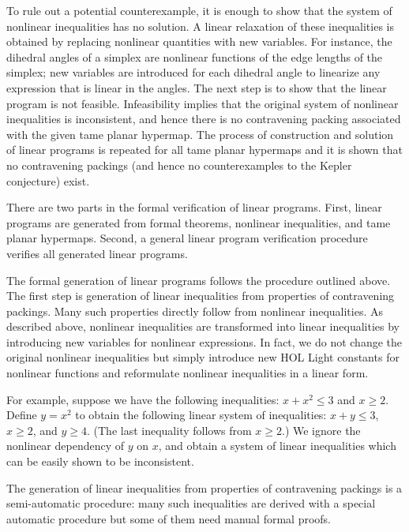 To rule out a potential counterexample, it is enough to show that the
system of nonlinear inequalities has no solution.  A linear relaxation
of these inequalities is obtained by replacing nonlinear quantities
with new variables. For instance, the dihedral angles of a simplex are
nonlinear functions of the edge lengths of the simplex; new variables
are introduced for each dihedral angle to linearize any expression that
is linear in the angles.  The next step is to show that
the linear program is not feasible. Infeasibility implies that the original
system of nonlinear inequalities is inconsistent, and hence there is
no contravening packing associated with the given tame planar
hypermap. The process of construction and solution of linear programs
is repeated for all tame planar hypermaps and it is shown that no
contravening packings (and hence no counterexamples to the Kepler
conjecture) exist.

There are two parts in the formal verification of linear
programs. First, linear programs are generated from formal theorems,
nonlinear inequalities, and tame planar hypermaps. Second, a general linear
program verification procedure verifies all generated linear programs.

The formal generation of linear programs follows the procedure
outlined above. The first step is generation of linear inequalities
from properties of contravening packings. Many such properties
directly follow from nonlinear inequalities. As described above,
nonlinear inequalities are transformed into linear inequalities by
introducing new variables for nonlinear expressions. In fact, we do
not change the original nonlinear inequalities but simply introduce
new HOL Light constants for nonlinear functions and reformulate
nonlinear inequalities in a linear form.

For example, suppose we have the following inequalities: $x +
x^2 \le 3$ and $x \ge 2$. Define $y = x^2$ to obtain the following
linear system of inequalities: $x + y \le 3$, $x \ge 2$, and $y \ge 4$.
(The last inequality follows from $x \ge 2$.)  We
ignore the nonlinear dependency of $y$ on $x$, and obtain a system of linear
inequalities which can be easily shown to be inconsistent.

The generation of linear inequalities from properties of contravening packings is
a semi-automatic procedure: many such inequalities are derived with a special
automatic procedure but some of them need manual formal proofs.

